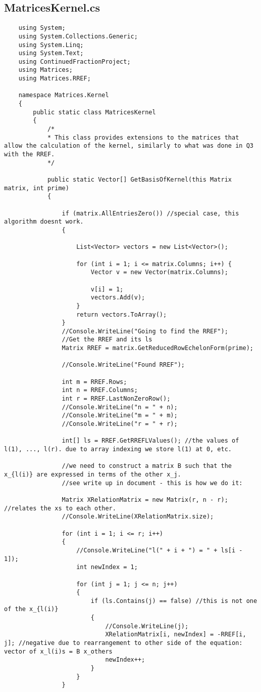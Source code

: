 \documentclass{article}
\begin{document}
\subsection{MatricesKernel.cs}

\begin{lstlisting}
	using System;
	using System.Collections.Generic;
	using System.Linq;
	using System.Text;
	using ContinuedFractionProject;
	using Matrices;
	using Matrices.RREF;
	
	namespace Matrices.Kernel
	{
		public static class MatricesKernel
		{
			/*
			* This class provides extensions to the matrices that allow the calculation of the kernel, similarly to what was done in Q3 with the RREF.
			*/
			
			public static Vector[] GetBasisOfKernel(this Matrix matrix, int prime)
			{
				
				if (matrix.AllEntriesZero()) //special case, this algorithm doesnt work.
				{
					
					List<Vector> vectors = new List<Vector>();
					
					for (int i = 1; i <= matrix.Columns; i++) {
						Vector v = new Vector(matrix.Columns);
						
						v[i] = 1;
						vectors.Add(v);
					}
					return vectors.ToArray();
				}
				//Console.WriteLine("Going to find the RREF");
				//Get the RREF and its ls
				Matrix RREF = matrix.GetReducedRowEchelonForm(prime);
				
				//Console.WriteLine("Found RREF");
				
				int m = RREF.Rows;
				int n = RREF.Columns;
				int r = RREF.LastNonZeroRow();
				//Console.WriteLine("n = " + n);
				//Console.WriteLine("m = " + m);
				//Console.WriteLine("r = " + r);
				
				int[] ls = RREF.GetRREFLValues(); //the values of l(1), ..., l(r). due to array indexing we store l(1) at 0, etc.
				
				//we need to construct a matrix B such that the x_{l(i)} are expressed in terms of the other x_j.
				//see write up in document - this is how we do it:
				
				Matrix XRelationMatrix = new Matrix(r, n - r); //relates the xs to each other.
				//Console.WriteLine(XRelationMatrix.size);
				
				for (int i = 1; i <= r; i++)
				{
					//Console.WriteLine("l(" + i + ") = " + ls[i - 1]);
					int newIndex = 1;
					
					for (int j = 1; j <= n; j++)
					{
						if (ls.Contains(j) == false) //this is not one of the x_{l(i)}
						{
							//Console.WriteLine(j);
							XRelationMatrix[i, newIndex] = -RREF[i, j]; //negative due to rearrangement to other side of the equation: vector of x_l(i)s = B x_others
							newIndex++;
						}
					}
				}
				

\end{lstlisting}
\end{document}
